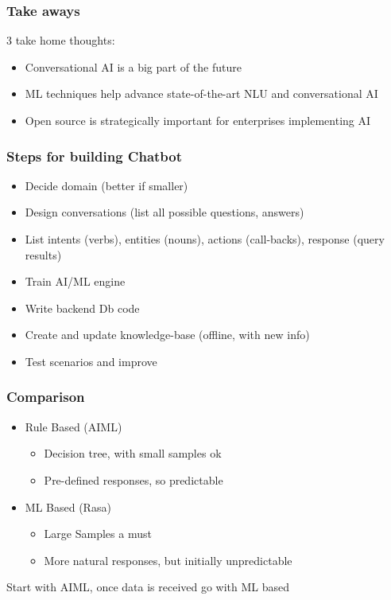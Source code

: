 

\begin{frame}\frametitle{Take aways}
3 take home thoughts:
\begin{itemize}
\item Conversational AI is a big part of the future
\item ML techniques help advance state-of-the-art NLU and conversational AI
\item  Open source is strategically important for enterprises 
implementing AI
\end{itemize}
\end{frame}

\begin{frame}\frametitle{Steps for building Chatbot }
\begin{itemize}
\item Decide domain (better if smaller)
\item Design conversations (list all possible questions, answers)
\item List intents (verbs), entities (nouns), actions (call-backs), response (query results)
\item Train AI/ML engine 
\item Write backend Db code
\item Create and update knowledge-base (offline, with new info)
\item Test scenarios and improve
\end{itemize}
\end{frame}

\begin{frame}\frametitle{Comparison}
\begin{itemize}
\item Rule Based (AIML)
\begin{itemize}
\item Decision tree, with small samples ok
\item Pre-defined responses, so predictable
\end{itemize}
\item ML Based (Rasa)
\begin{itemize}
\item Large Samples a must
\item More natural responses, but initially unpredictable
\end{itemize}
\end{itemize}

Start with AIML, once data is received go with ML based
\end{frame}

